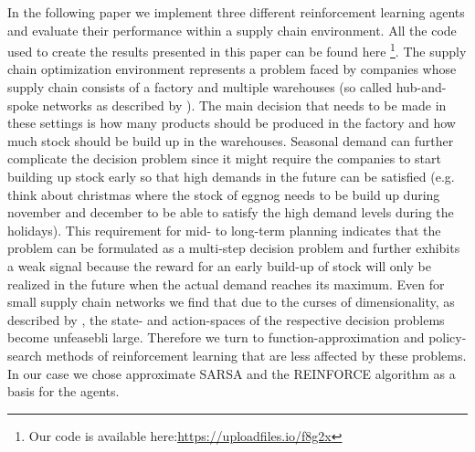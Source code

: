 \documentclass[journal, a4paper]{IEEEtran}
\theoremstyle{plain}
\theoremstyle{definition}
\begin{document}
In the following paper we implement three different reinforcement learning agents and evaluate their performance within a supply chain environment. All the code used to create the results presented in this paper can be found here \footnote{Our code is available here:\url{https://uploadfiles.io/f8g2x}}. \newline
The supply chain optimization environment represents a problem faced by companies whose supply chain consists of a factory and multiple warehouses (so called hub-and-spoke networks as described by \cite{MFL}). The main decision that needs to be made in these settings is how many products should be produced in the factory and how much stock should be build up in the warehouses. Seasonal demand can further complicate the decision problem since it might require the companies to start building up stock early so that high demands in the future can be satisfied (e.g. think about christmas where the stock of eggnog needs to be build up during november and december to be able to satisfy the high demand levels during the holidays). This requirement for mid- to long-term planning indicates that the problem can be formulated as a multi-step decision problem and further exhibits a weak signal because the reward for an early build-up of stock will only be realized in the future when the actual demand reaches its maximum. \newline
Even for small supply chain networks we find that due to the curses of dimensionality, as described by \cite{PowellADP}, the state- and action-spaces of the respective decision problems become unfeasebli large. Therefore we turn to function-approximation and policy-search methods of reinforcement learning that are less affected by these problems. In our case we chose approximate SARSA and the REINFORCE algorithm as a basis for the agents.
\end{document}
